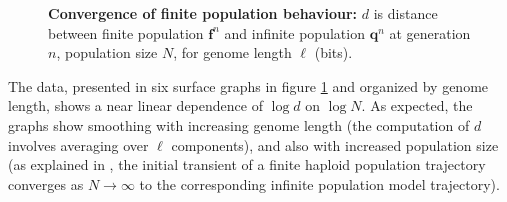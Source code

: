 \begin{figure}[htp]
\begin{center}
\hspace{5pt}
\caption[\textbf{Convergence of finite population behaviour}]{\textbf{Convergence of finite population behaviour:} $d$ is
  distance between finite population ${\bm f}^n$ and infinite
  population ${\bm q}^n$ at generation $n$, population size $N$, for
  genome length $\ell$ (bits).}
\label{convergence}
\end{center}
\end{figure}

The data, presented in six surface graphs in figure \ref{convergence} and organized by
genome length, shows a near linear dependence of $\log d$ on $\log N$.
As expected, the graphs show smoothing with increasing genome length
(the computation of $d$ involves averaging over $\ell$ components),
and also with increased population size (as explained in
\cite{Vose1999}, the initial transient of a finite haploid population
trajectory converges as $N \rightarrow \infty$ to the corresponding
infinite population model trajectory).

